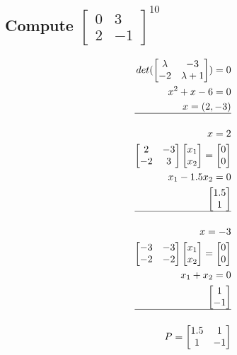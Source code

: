 \documentclass[12pt, a4paper]{article}
\begin{document}
		\subsection{Compute $\begin{bmatrix}0&3\\2&-1\end{bmatrix}^{10}$}
			\begin{align*}
				det(\begin{bmatrix}\lambda&-3\\-2&\lambda+1\end{bmatrix})=0\\
				x^2+x-6=0\\
				x=(2,-3)\\
				\hline\\
				x=2\\
				\begin{bmatrix}2&-3\\-2&3\end{bmatrix}\begin{bmatrix}x_1\\x_2\end{bmatrix}=\begin{bmatrix}0\\0\end{bmatrix}\\
				x_1-1.5x_2=0\\
				\begin{bmatrix}1.5\\1\end{bmatrix}\\
				\hline\\
				x=-3\\
				\begin{bmatrix}-3&-3\\-2&-2\end{bmatrix}\begin{bmatrix}x_1\\x_2\end{bmatrix}=\begin{bmatrix}0\\0\end{bmatrix}\\
				x_1+x_2=0\\
				\begin{bmatrix}1\\-1\end{bmatrix}\\
				\hline\\
				P=\begin{bmatrix}1.5&1\\1&-1\end{bmatrix}\\

\end{align*}
\end{document}
